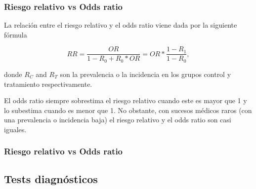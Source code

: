 \begin{frame}
\frametitle{Riesgo relativo vs Odds ratio} 
La relación entre el riesgo relativo y el odds ratio viene dada por la siguiente fórmula 

\[
  RR = \frac{OR}{1-R_0+R_0*OR}=OR*\frac{1-R_1}{1-R_0},
\]

donde $R_C$ and $R_T$ son la prevalencia o la incidencia en los grupos control y tratamiento respectivamente.

El odds ratio siempre sobrestima el riesgo relativo cuando este es mayor que 1 y lo subestima cuando es menor que 1.
No obstante, con sucesos médicos raros (con una prevalencia o incidencia baja) el riesgo relativo y el odds ratio son casi iguales.
\end{frame}


\begin{frame}
\frametitle{Riesgo relativo vs Odds ratio} 
\begin{center}
\end{center}
\end{frame}


\subsection{Tests diagnósticos}

